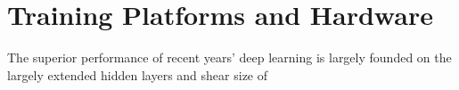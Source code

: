 \section{Training Platforms and Hardware}
The superior performance of recent years' deep learning is largely founded on the largely extended hidden layers and shear size of 